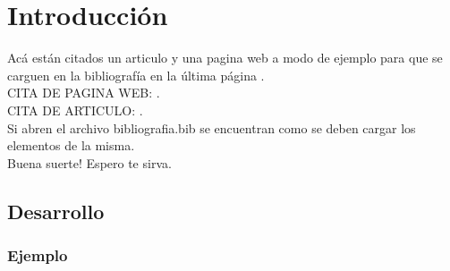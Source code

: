 \section{Introducción}
Acá están citados un articulo y una pagina web a modo de ejemplo para que se carguen en la bibliografía en la última página .\\
CITA DE PAGINA WEB: \cite{PhoenixWebSwitchFO}.\\
CITA DE ARTICULO: \cite{ProtocoloModbus}.\\
Si abren el archivo bibliografia.bib se encuentran como se deben cargar los elementos de la misma.\\

Buena suerte! Espero te sirva.

\subsection{Desarrollo}
\lipsum[2-4]
\subsubsection{Ejemplo}
\lipsum[2-4]